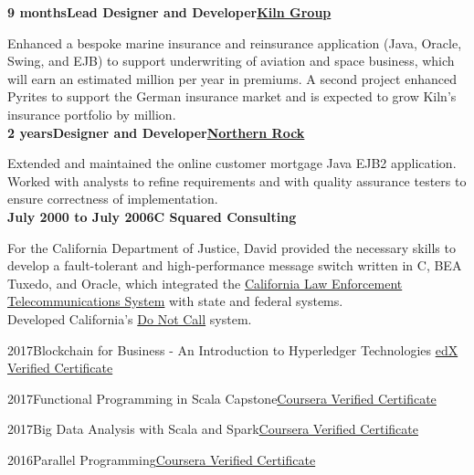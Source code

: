 \documentclass[a4paper,12pt]{article}
\newcommand{\head}[1]{\begin{center}{\large{\textbf{\sc{#1}}}}\nopagebreak\end{center}}
\newcommand{\jobheld}[2]{\textbf{#1\hfill #2}\nopagebreak}
\newcommand{\clientwork}[3]{\textbf{#1\hfill#3\hfill#2}\nopagebreak}
\newcommand{\tab}{\hspace{2em}}
\newcommand{\education}[3]{#1\tab#2\hfill#3}
\begin{document}
\clientwork{9 months}{\href{http://www.tokiomarinekiln.com/}{Kiln Group}}{Lead Designer and Developer}

Enhanced a bespoke marine insurance and reinsurance application (Java, Oracle, Swing, and EJB) to support underwriting of aviation and space business, which will earn an estimated  million per year in premiums. A second project enhanced Pyrites to support the German insurance market and is expected to grow  Kiln's insurance portfolio by  million.\\

\clientwork{2 years}{\href{http://www.northernrock.co.uk}{Northern Rock}}{Designer and Developer}

Extended and maintained the online customer mortgage Java EJB2 application. Worked with analysts to refine requirements and with quality assurance testers to ensure correctness of implementation.\\

\jobheld{July 2000 to July 2006}{C Squared Consulting}

For the California Department of Justice, David provided the necessary skills to develop a fault-tolerant and high-performance message switch written in C, BEA Tuxedo, and Oracle, which integrated the \href{http://definitions.uslegal.com/c/clets/}{California Law Enforcement Telecommunications System} with state and federal systems.\\

Developed California's \href{http://www.sfgate.com/cgi-bin/article.cgi?f=/c/a/2003/03/31/MN5478.DTL}{Do Not Call} system.\\

\head{Certifications}

\education{2017}{Blockchain for Business - An Introduction to Hyperledger Technologies
}{\href{https://courses.edx.org/certificates/de3424d0c11842f48fb2c79ddf1073c8}{edX Verified Certificate}}

\education{2017}{Functional Programming in Scala Capstone}{\href{https://www.coursera.org/account/accomplishments/verify/4F5MVWUN8MWZ}{Coursera Verified Certificate}}

\education{2017}{Big Data Analysis with Scala and Spark}{\href{https://www.coursera.org/account/accomplishments/verify/BT95Z35S6LVX}{Coursera Verified Certificate}}

\education{2016}{Parallel Programming}{\href{https://www.coursera.org/account/accomplishments/verify/CJ4JSLUQK73D}{Coursera Verified Certificate}}
\end{document}
